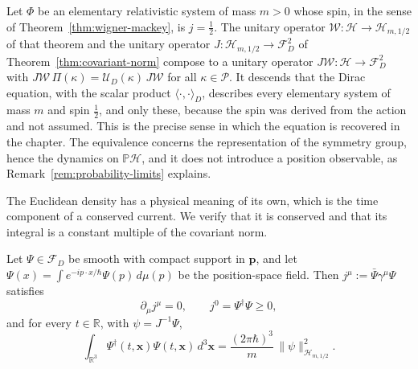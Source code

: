 	\begin{remark}\label{rem:dirac-recovery}
		Let $\Phi$ be an elementary relativistic system of mass $m>0$ whose spin, in the sense of Theorem~\ref{thm:wigner-mackey}, is $j=\frac12$. The unitary operator $\mathcal{W}:\mathcal{H}\to\mathcal{H}_{m,1/2}$ of that theorem and the unitary operator $J:\mathcal{H}_{m,1/2}\to\mathcal{F}_D^2$ of Theorem~\ref{thm:covariant-norm} compose to a unitary operator $J\mathcal{W}:\mathcal{H}\to\mathcal{F}_D^2$ with $J\mathcal{W}\,\Pi(\kappa)=\mathcal{U}_D(\kappa)\,J\mathcal{W}$ for all $\kappa\in\mathcal{P}$. It descends that the Dirac equation, with the scalar product $\langle\cdot,\cdot\rangle_D$, describes every elementary system of mass $m$ and spin $\frac12$, and only these, because the spin was derived from the action and not assumed. This is the precise sense in which the equation is recovered in the chapter. The equivalence concerns the representation of the symmetry group, hence the dynamics on $\mathbb{P}\mathcal{H}$, and it does not introduce a position observable, as Remark~\ref{rem:probability-limits} explains.
	\end{remark}
	
	The Euclidean density has a physical meaning of its own, which is the time component of a conserved current. We verify that it is conserved and that its integral is a constant multiple of the covariant norm.
	
	\begin{proposition}\label{prop:continuity}
		Let $\Psi\in\mathcal{F}_D$ be smooth with compact support in $\mathbf{p}$, and let $\Psi(x)=\int e^{-ip\cdot x/\hbar}\Psi(p)\,d\mu(p)$ be the position-space field. Then $j^\mu:=\bar{\Psi}\gamma^\mu\Psi$ satisfies
		\begin{equation}\label{eq:continuity}
			\partial_\mu j^\mu=0, \qquad j^0=\Psi^\dagger\Psi\geq0,
		\end{equation}
		and for every $t\in\mathbb{R}$, with $\psi=J^{-1}\Psi$,
		\begin{equation}\label{eq:charge}
			\int_{\mathbb{R}^3}\Psi^\dagger(t,\mathbf{x})\Psi(t,\mathbf{x})\,d^3\mathbf{x}=\frac{(2\pi\hbar)^3}{m}\,\|\psi\|^2_{\mathcal{H}_{m,1/2}}.
		\end{equation}
	\end{proposition}
	
